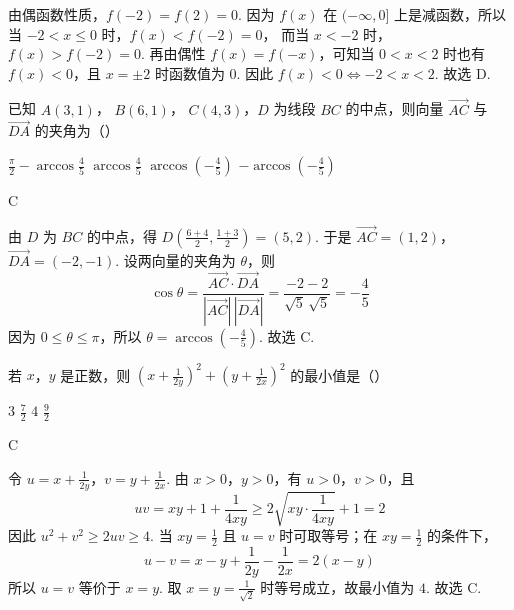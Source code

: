\begin{solution}
由偶函数性质，\(f(-2)=f(2)=0\). 因为 \(f(x)\) 在 \((-\infty,0]\) 上是减函数，所以当 \(-2<x\leqslant0\) 时，\(f(x)<f(-2)=0\)，
而当 \(x<-2\) 时，\(f(x)>f(-2)=0\). 再由偶性 \(f(x)=f(-x)\)，可知当 \(0<x<2\) 时也有 \(f(x)<0\)，且 \(x=\pm2\) 时函数值为 \(0\). 因此
\(f(x)<0\Longleftrightarrow -2<x<2\).
故选 D.
\end{solution}

\begin{problem}
已知 \( A(3,1) \)， \( B(6,1) \)， \( C(4,3) \)，\(D\) 为线段 \(BC\) 的中点，则向量 \( \overrightarrow{AC} \) 与 \( \overrightarrow{DA} \) 的夹角为（\quad）

\choices
    {\(\frac{\pi}{2} - \arccos \frac{4}{5}\)}
    {\(\arccos \frac{4}{5}\)}
    {\(\arccos \left(-\frac{4}{5}\right)\)}
    {\(-\arccos \left(-\frac{4}{5}\right)\)}
\end{problem}

\begin{answer}
C
\end{answer}

\begin{solution}
由 \(D\) 为 \(BC\) 的中点，得 \(D\left(\frac{6+4}{2},\frac{1+3}{2}\right)=(5,2)\). 于是 \(\overrightarrow{AC}=(1,2)\)，\(\overrightarrow{DA}=(-2,-1)\).
设两向量的夹角为 \(\theta\)，则
\[
\cos\theta=\frac{\overrightarrow{AC}\cdot\overrightarrow{DA}}
{|\overrightarrow{AC}|\,|\overrightarrow{DA}|}
=\frac{-2-2}{\sqrt5\,\sqrt5}=-\frac45
\]
因为 \(0\leqslant\theta\leqslant\pi\)，所以
\(\theta=\arccos\left(-\frac45\right)\). 故选 C.
\end{solution}

\begin{problem}
若 \(x\)，\(y\) 是正数，则 \(\left(x + \frac{1}{2y}\right)^2 + \left(y + \frac{1}{2x}\right)^2\) 的最小值是（\quad）

\choices
    {\(3\)}
    {\( \frac{7}{2} \)}
    {\(4\)}
    {\(\frac{9}{2}\)}
\end{problem}

\begin{answer}
C
\end{answer}

\begin{solution}
令 \(u=x+\frac{1}{2y}\)，\(v=y+\frac{1}{2x}\).
由 \(x>0\)，\(y>0\)，有 \(u>0\)，\(v>0\)，且
\[
uv=xy+1+\frac{1}{4xy}
\geqslant2\sqrt{xy\cdot\frac{1}{4xy}}+1=2
\]
因此 \(u^2+v^2\geqslant2uv\geqslant4\).
当 \(xy=\frac12\) 且 \(u=v\) 时可取等号；在 \(xy=\frac12\) 的条件下，
\[
u-v=x-y+\frac{1}{2y}-\frac{1}{2x}=2(x-y)
\]
所以 \(u=v\) 等价于 \(x=y\). 取 \(x=y=\frac{1}{\sqrt2}\) 时等号成立，故最小值为 \(4\). 故选 C.
\end{solution}

